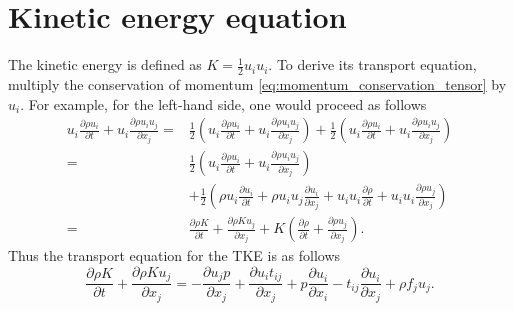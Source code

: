 \documentclass[oneside,a4paper,11pt]{report}
\begin{document}
\section{Kinetic energy equation}
The kinetic energy is defined as $K = \frac{1}{2} u_i u_i$. To derive its transport equation, multiply the conservation of momentum \cref{eq:momentum_conservation_tensor} by $u_i$. For example, for the left-hand side, one would proceed as follows
\begin{align}
u_i \frac{\partial \rho u_i}{\partial t} + u_i \frac{ \partial \rho u_i u_j}{\partial x_j} = &\frac{1}{2} \left ( u_i \frac{\partial \rho u_i}{\partial t} + u_i \frac{ \partial \rho u_i u_j}{\partial x_j} \right ) + \frac{1}{2} \left ( u_i \frac{\partial \rho u_i}{\partial t} + u_i \frac{ \partial \rho u_i u_j}{\partial x_j} \right ) \nonumber \\
= & \frac{1}{2} \left ( u_i \frac{\partial \rho u_i}{\partial t} + u_i \frac{ \partial \rho u_i u_j}{\partial x_j} \right ) \nonumber \\
& + \frac{1}{2} \left ( \rho u_i \frac{ \partial u_i}{\partial t} + \rho u_i u_j \frac{ \partial u_i}{\partial x_j} + u_i u_i \frac{\partial \rho}{\partial t} + u_i u_i \frac{\partial \rho u_j}{\partial x_j} \right ) \nonumber \\
= & \frac{\partial \rho K}{\partial t} + \frac{\partial \rho K u_j}{\partial x_j} + K \left ( \frac{\partial \rho}{\partial t} + \frac{\partial \rho u_j}{\partial x_j} \right ).
\end{align}
Thus the transport equation for the TKE is as follows 
\begin{equation}
\label{eq:kinetic_energy}
\frac{\partial \rho K}{\partial t} + \frac{\partial \rho K u_j}{\partial x_j} = - \frac{\partial u_j p}{\partial x_j} + \frac{\partial u_i t_{ij}}{\partial x_j} + p \frac{\partial u_i}{\partial x_i} - t_{ij} \frac{\partial u_i}{\partial x_j} + \rho f_j u_j .
\end{equation}

\end{document}
